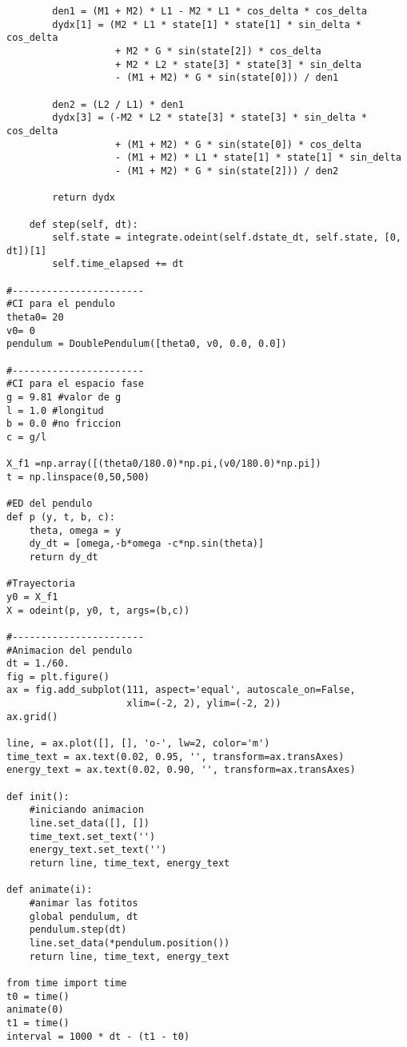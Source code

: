 \documentclass[12pt]{article}
\begin{document}
{\begin{verbatim}
        den1 = (M1 + M2) * L1 - M2 * L1 * cos_delta * cos_delta
        dydx[1] = (M2 * L1 * state[1] * state[1] * sin_delta * cos_delta
                   + M2 * G * sin(state[2]) * cos_delta
                   + M2 * L2 * state[3] * state[3] * sin_delta
                   - (M1 + M2) * G * sin(state[0])) / den1

        den2 = (L2 / L1) * den1
        dydx[3] = (-M2 * L2 * state[3] * state[3] * sin_delta * cos_delta
                   + (M1 + M2) * G * sin(state[0]) * cos_delta
                   - (M1 + M2) * L1 * state[1] * state[1] * sin_delta
                   - (M1 + M2) * G * sin(state[2])) / den2
        
        return dydx

    def step(self, dt):
        self.state = integrate.odeint(self.dstate_dt, self.state, [0, dt])[1]
        self.time_elapsed += dt

#-----------------------
#CI para el pendulo
theta0= 20
v0= 0
pendulum = DoublePendulum([theta0, v0, 0.0, 0.0])

#-----------------------
#CI para el espacio fase
g = 9.81 #valor de g
l = 1.0 #longitud
b = 0.0 #no friccion
c = g/l

X_f1 =np.array([(theta0/180.0)*np.pi,(v0/180.0)*np.pi])
t = np.linspace(0,50,500)

#ED del pendulo
def p (y, t, b, c):
    theta, omega = y
    dy_dt = [omega,-b*omega -c*np.sin(theta)]
    return dy_dt

#Trayectoria
y0 = X_f1                       
X = odeint(p, y0, t, args=(b,c))         

#-----------------------
#Animacion del pendulo
dt = 1./60.
fig = plt.figure()
ax = fig.add_subplot(111, aspect='equal', autoscale_on=False,
                     xlim=(-2, 2), ylim=(-2, 2))
ax.grid()

line, = ax.plot([], [], 'o-', lw=2, color='m')
time_text = ax.text(0.02, 0.95, '', transform=ax.transAxes)
energy_text = ax.text(0.02, 0.90, '', transform=ax.transAxes)

def init():
    #iniciando animacion
    line.set_data([], [])
    time_text.set_text('')
    energy_text.set_text('')
    return line, time_text, energy_text

def animate(i):
    #animar las fotitos
    global pendulum, dt
    pendulum.step(dt)
    line.set_data(*pendulum.position())
    return line, time_text, energy_text

from time import time
t0 = time()
animate(0)
t1 = time()
interval = 1000 * dt - (t1 - t0)


\end{verbatim}}
\end{document}
